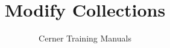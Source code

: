 

\title{Modify Collections} %
\author{Cerner Training Manuals}



    \frontmatter
        \maketitle %

    \mainmatter
        

    \backmatter


